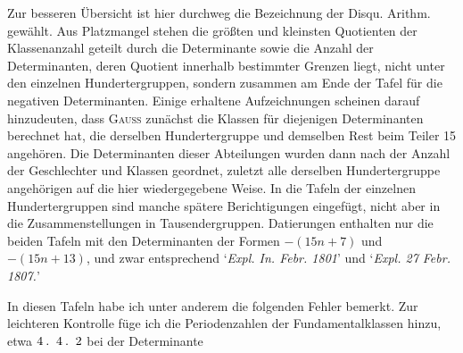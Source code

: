 Zur besseren Übersicht ist hier durchweg die Bezeichnung der Disqu. Arithm. gewählt. Aus Platzmangel stehen die größten und kleinsten Quotienten der Klassenanzahl geteilt durch die Determinante sowie die Anzahl der Determinanten, deren Quotient innerhalb bestimmter Grenzen liegt, nicht unter den einzelnen Hundertergruppen, sondern zusammen am Ende der Tafel für die negativen Determinanten. Einige erhaltene Aufzeichnungen scheinen darauf hinzudeuten, dass \textsc{Gauss} zunächst die Klassen für diejenigen Determinanten berechnet hat, die derselben Hundertergruppe und demselben Rest beim Teiler 15 angehören. Die Determinanten dieser Abteilungen wurden dann nach der Anzahl der Geschlechter und Klassen geordnet, zuletzt alle derselben Hundertergruppe angehörigen auf die hier wiedergegebene Weise.
In die Tafeln der einzelnen Hundertergruppen sind manche spätere Berichtigungen eingefügt, nicht aber in die Zusammenstellungen in Tausendergruppen. Datierungen enthalten nur die beiden Tafeln mit den Determinanten der Formen $-(15n+7)$ und $-(15n+13)$, und zwar entsprechend ‘\textit{Expl. In. Febr. 1801}’ und ‘\textit{Expl. 27 Febr. 1807.}’
\par In diesen Tafeln habe ich unter anderem die folgenden Fehler bemerkt. Zur leichteren Kontrolle füge ich die Periodenzahlen der Fundamentalklassen hinzu, etwa $4\pdot\ 4\pdot\ 2$ bei der Determinante
